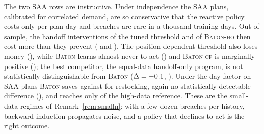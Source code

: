 \documentclass[preprint,authoryear,12pt]{elsarticle}
\theoremstyle{definition}
\theoremstyle{remark}
\begin{document}
The two \textsc{SAA} rows are instructive. Under independence the
\textsc{SAA} plans, calibrated for correlated demand, are so conservative
that the reactive policy costs only \depRhoZeroSaaReact{} per plan-day
and breaches are rare in a thousand training days. Out of sample, the
handoff interventions of the tuned threshold and of \textsc{Baton-ho}
then cost more than they prevent (\depRhoZeroSaaThr{} and
\depRhoZeroSaaHo). The position-dependent threshold also loses money
(\depRhoZeroSaaThrK), while \textsc{Baton} learns almost never to act
(\depRhoZeroSaaBaton) and \textsc{Baton-cf} is marginally positive
(\depRhoZeroSaaCf); the best competitor, the equal-data handoff-only
program, is not statistically distinguishable from \textsc{Baton} ($\Delta =
-0.1$, \depRhoZeroSaaDeltaCI). Under the day factor on
\textsc{SAA} plans \textsc{Baton} saves \depDayfacSaaBaton{} against
\depDayfacSaaCompSv{} for restocking, again no statistically detectable difference
(\depDayfacSaaDeltaCI), and reaches only \depDayfacSaaRatio{} of the
high-data reference. These are the small-data regimes of
Remark~\ref{rem:smalln}: with a few dozen breaches per history, backward
induction propagates noise, and a policy that declines to act is the
right outcome.


\end{document}
